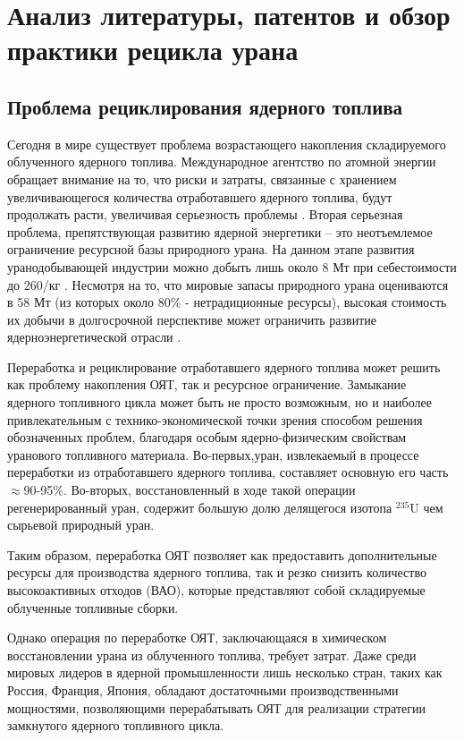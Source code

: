 \chapter{Анализ литературы, патентов и обзор практики рецикла урана}\label{ch1}

\section{Проблема рециклирования ядерного топлива}

Сегодня в мире существует проблема возрастающего накопления складируемого облученного ядерного топлива. Международное агентство по атомной энергии обращает внимание на то, что риски и затраты, связанные с хранением увеличивающегося количества отработавшего ядерного топлива, будут продолжать расти, увеличивая серьезность проблемы \cite{international2019iaea}. Вторая серьезная проблема, препятствующая развитию ядерной энергетики -- это неотъемлемое ограничение ресурсной базы природного урана. На данном этапе развития уранодобывающей индустрии можно добыть лишь около 8 Мт при себестоимости до 260\textdollar/кг \cite{/content/publication/d82388ab-en}. Несмотря на то, что мировые запасы природного урана оцениваются в 58 Мт (из которых около 80\% - нетрадиционные ресурсы), высокая стоимость их добычи в долгосрочной перспективе может ограничить развитие ядерноэнергетической отрасли \cite{international2019iaea}.

Переработка и рециклирование отработавшего ядерного топлива может решить как проблему накопления ОЯТ, так и ресурсное ограничение. Замыкание ядерного топливного цикла может быть не просто возможным, но и наиболее привлекательным с технико-экономической точки зрения способом решения обозначенных проблем, благодаря особым ядерно-физическим свойствам уранового топливного материала. Во-первых,уран, извлекаемый в процессе переработки из отработавшего ядерного топлива, составляет основную его часть $\approx$90-95\%. Во-вторых, восстановленный в ходе такой операции регенерированный уран, содержит большую долю делящегося изотопа $^{235}$U чем сырьевой природный уран.

Таким образом, переработка ОЯТ позволяет как предоставить дополнительные ресурсы для производства ядерного топлива, так и резко снизить количество высокоактивных отходов (ВАО), которые представляют собой складируемые облученные топливные сборки.

Однако операция по переработке ОЯТ, заключающаяся в химическом восстановлении урана из облученного топлива, требует затрат. Даже среди мировых лидеров в ядерной промышленности лишь несколько стран, таких как Россия, Франция, Япония, обладают достаточными производственными мощностями, позволяющими перерабатывать ОЯТ для реализации стратегии замкнутого ядерного топливного цикла.

